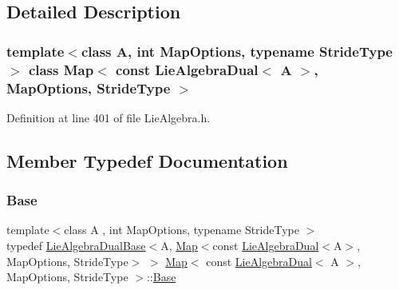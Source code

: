 \subsection{Detailed Description}
\subsubsection*{template$<$class A, int Map\+Options, typename Stride\+Type$>$\newline
class Map$<$ const Lie\+Algebra\+Dual$<$ A $>$, Map\+Options, Stride\+Type $>$}



Definition at line 401 of file Lie\+Algebra.\+h.



\subsection{Member Typedef Documentation}
\hypertarget{class_map_3_01const_01_lie_algebra_dual_3_01_a_01_4_00_01_map_options_00_01_stride_type_01_4_ae2af81dfcc79fd0a3794e4f13cf9229b}{}\label{class_map_3_01const_01_lie_algebra_dual_3_01_a_01_4_00_01_map_options_00_01_stride_type_01_4_ae2af81dfcc79fd0a3794e4f13cf9229b} 
\subsubsection{\texorpdfstring{Base}{Base}}
{\footnotesize\ttfamily template$<$class A , int Map\+Options, typename Stride\+Type $>$ \\
typedef \hyperlink{class_lie_algebra_dual_base}{Lie\+Algebra\+Dual\+Base}$<$A, \hyperlink{class_map_3_01const_01_lie_algebra_dual_3_01_a_01_4_00_01_map_options_00_01_stride_type_01_4_a3733e2160ea4f13268b2b3e34b33d7c7}{Map}$<$const \hyperlink{class_lie_algebra_dual}{Lie\+Algebra\+Dual}$<$A$>$, Map\+Options, Stride\+Type$>$ $>$ \hyperlink{class_map_3_01const_01_lie_algebra_dual_3_01_a_01_4_00_01_map_options_00_01_stride_type_01_4_a3733e2160ea4f13268b2b3e34b33d7c7}{Map}$<$ const \hyperlink{class_lie_algebra_dual}{Lie\+Algebra\+Dual}$<$ A $>$, Map\+Options, Stride\+Type $>$\+::\hyperlink{class_map_3_01const_01_lie_algebra_dual_3_01_a_01_4_00_01_map_options_00_01_stride_type_01_4_ae2af81dfcc79fd0a3794e4f13cf9229b}{Base}\hspace{0.3cm}{\ttfamily [protected]}}

